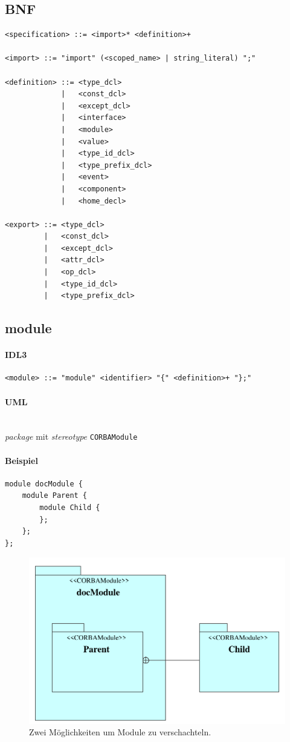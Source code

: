 \documentclass [a4paper,10pt] {scrartcl}
\begin{document}
\subsection{BNF}
\begin{verbatim}
<specification> ::= <import>* <definition>+

<import> ::= "import" (<scoped_name> | string_literal) ";"

<definition> ::= <type_dcl>
             |   <const_dcl>
             |   <except_dcl>
             |   <interface>
             |   <module>
             |   <value>
             |   <type_id_dcl>
             |   <type_prefix_dcl>
             |   <event>
             |   <component>
             |   <home_decl>

<export> ::= <type_dcl>
         |   <const_dcl>
         |   <except_dcl>
         |   <attr_dcl>
         |   <op_dcl>
         |   <type_id_dcl>
         |   <type_prefix_dcl>
\end{verbatim}

\cleardoublepage
\subsection{module}
\paragraph{IDL3}
\begin{verbatim}
<module> ::= "module" <identifier> "{" <definition>+ "};"
\end{verbatim}
\paragraph{UML}~\\
\emph{package} mit \emph{stereotype} \texttt{CORBAModule}\\
\paragraph{Beispiel}
\begin{verbatim}
module docModule {
    module Parent {
        module Child {
        };
    };
};
\end{verbatim}
\begin{figure}[!h]
\centerline{\includegraphics[width=\linewidth]{docModule}}
\caption{Zwei M{\"o}glichkeiten um Module zu verschachteln.}
\label{fig:module}
\end{figure}
\end{document}
